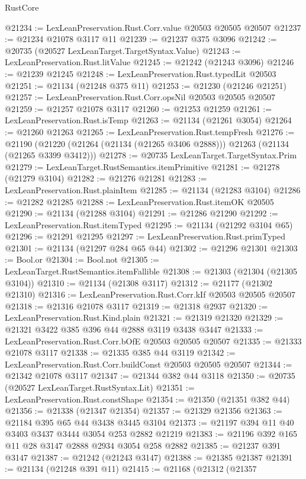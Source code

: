 \begin{lexlean}{RustCore}
\begin{coremodule}
@21234 := LexLeanPreservation.Rust.Corr.value @20503 @20505 @20507
@21237 := @21234 @21078 @3117 @11
@21239 := @21237 @375 @3096
@21242 := @20735 (@20527 LexLeanTarget.TargetSyntax.Value)
@21243 := LexLeanPreservation.Rust.litValue
@21245 := @21242 (@21243 @3096)
@21246 := @21239 @21245
@21248 := LexLeanPreservation.Rust.typedLit @20503
@21251 := @21134 (@21248 @375 @11)
@21253 := @21230 (@21246 @21251)
@21257 := LexLeanPreservation.Rust.Corr.opsNil @20503 @20505 @20507
@21259 := @21257 @21078 @3117
@21260 := @21253 @21259
@21261 := LexLeanPreservation.Rust.isTemp
@21263 := @21134 (@21261 @3054)
@21264 := @21260 @21263
@21265 := LexLeanPreservation.Rust.tempFresh
@21276 := @21190
    (@21220 (@21264 (@21134 (@21265 @3406 @2888))) @21263 (@21134 (@21265 @3399 @3412)))
@21278 := @20735 LexLeanTarget.TargetSyntax.Prim
@21279 := LexLeanTarget.RustSemantics.itemPrimitive
@21281 := @21278 (@21279 @3104)
@21282 := @21276 @21281
@21283 := LexLeanPreservation.Rust.plainItem
@21285 := @21134 (@21283 @3104)
@21286 := @21282 @21285
@21288 := LexLeanPreservation.Rust.itemOK @20505
@21290 := @21134 (@21288 @3104)
@21291 := @21286 @21290
@21292 := LexLeanPreservation.Rust.itemTyped
@21295 := @21134 (@21292 @3104 @65)
@21296 := @21291 @21295
@21297 := LexLeanPreservation.Rust.primTyped
@21301 := @21134 (@21297 @284 @65 @44)
@21302 := @21296 @21301
@21303 := Bool.or
@21304 := Bool.not
@21305 := LexLeanTarget.RustSemantics.itemFallible
@21308 := @21303 (@21304 (@21305 @3104))
@21310 := @21134 (@21308 @3117)
@21312 := @21177 (@21302 @21310)
@21316 := LexLeanPreservation.Rust.Corr.kIf @20503 @20505 @20507
@21318 := @21316 @21078 @3117
@21319 := @21318 @2937
@21320 := LexLeanPreservation.Rust.Kind.plain
@21321 := @21319 @21320
@21329 := @21321 @3422 @385 @396 @44 @2888 @3119 @3438 @3447
@21333 := LexLeanPreservation.Rust.Corr.bOfE @20503 @20505 @20507
@21335 := @21333 @21078 @3117
@21338 := @21335 @385 @44 @3119
@21342 := LexLeanPreservation.Rust.Corr.buildConst @20503 @20505 @20507
@21344 := @21342 @21078 @3117
@21347 := @21344 @382 @44 @3118
@21350 := @20735 (@20527 LexLeanTarget.RustSyntax.Lit)
@21351 := LexLeanPreservation.Rust.constShape
@21354 := @21350 (@21351 @382 @44)
@21356 := @21338 (@21347 @21354)
@21357 := @21329 @21356
@21363 := @21184 @395 @65 @44 @3438 @3445 @3104
@21373 := @21197 @394 @11 @40 @3403 @3437 @3444 @3054 @253 @2882 @21219
@21383 := @21196 @392 @165 @11 @28 @3147 @2888 @2934 @3054 @258 @2882
@21385 := @21237 @391 @3147
@21387 := @21242 (@21243 @3147)
@21388 := @21385 @21387
@21391 := @21134 (@21248 @391 @11)
@21415 := @21168
    (@21312
      (@21357

\end{coremodule}
\end{lexlean}
